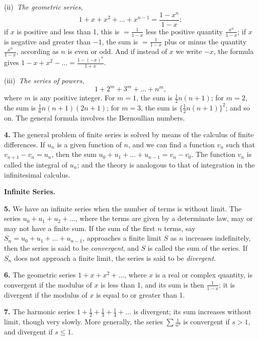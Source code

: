 \documentclass[11pt,a4paper]{article}
\begin{document}
(ii)~\textit{The geometric series,}
\[
1 + x + x^{2} + \ldots + x^{n-1} = \frac{1 - x^{n}}{1 - x};
\]
if $x$ is positive and less than 1, this is $= \frac{1}{1 - x}$ less the positive quantity $\frac{x^{n}}{1 - x}$; if $x$ is negative and greater than $-1$, the sum is $= \frac{1}{1 - x}$ plus or minus the quantity $\frac{x^{n}}{1 - x}$, according as $n$ is even or odd. And if instead of $x$ we write $-x$, the formula gives $1 - x + x^{2} - \ldots = \frac{1 - (-x)^{n}}{1 + x}$.

(iii)~\textit{The series of powers,}
\[
1 + 2^{m} + 3^{m} + \ldots + n^{m},
\]
where $m$ is any positive integer. For $m = 1$, the sum is $\frac{1}{2}n(n + 1)$; for $m = 2$, the sum is $\frac{1}{6}n(n + 1)(2n + 1)$; for $m = 3$, the sum is $\{\frac{1}{2}n(n + 1)\}^{2}$; and so on. The general formula involves the Bernoullian numbers.

\textbf{4.}\quad
The general problem of finite series is solved by means of the calculus of finite differences. If $u_{n}$ is a given function of $n$, and we can find a function $v_{n}$ such that $v_{n+1} - v_{n} = u_{n}$, then the sum $u_{0} + u_{1} + \ldots + u_{n-1} = v_{n} - v_{0}$. The function $v_{n}$ is called the integral of $u_{n}$; and the theory is analogous to that of integration in the infinitesimal calculus.

\bigskip
\noindent\textbf{Infinite Series.}

\smallskip

\textbf{5.}\quad
We have an infinite series when the number of terms is without limit. The series $u_{0} + u_{1} + u_{2} + \ldots$, where the terms are given by a determinate law, may or may not have a finite sum. If the sum of the first $n$ terms, say $S_{n} = u_{0} + u_{1} + \ldots + u_{n-1}$, approaches a finite limit $S$ as $n$ increases indefinitely, then the series is said to be \textit{convergent}, and $S$ is called the sum of the series. If $S_{n}$ does not approach a finite limit, the series is said to be \textit{divergent}.

\textbf{6.}\quad
The geometric series $1 + x + x^{2} + \ldots$, where $x$ is a real or complex quantity, is convergent if the modulus of $x$ is less than 1, and its sum is then $\frac{1}{1 - x}$; it is divergent if the modulus of $x$ is equal to or greater than 1.

\textbf{7.}\quad
The harmonic series $1 + \frac{1}{2} + \frac{1}{3} + \frac{1}{4} + \ldots$ is divergent; its sum increases without limit, though very slowly. More generally, the series $\sum \frac{1}{n^{s}}$ is convergent if $s > 1$, and divergent if $s \leq 1$.
\end{document}
